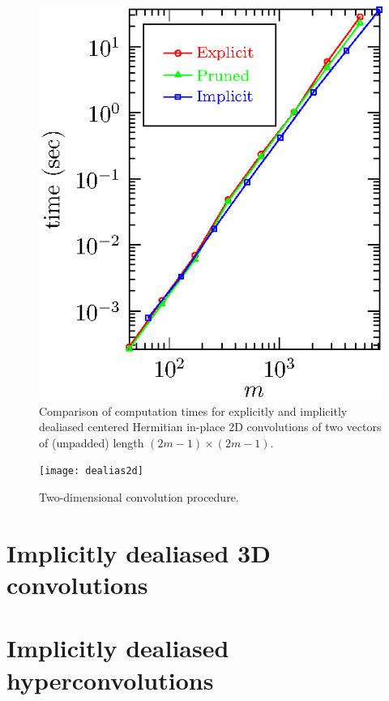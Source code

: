 \documentclass[final]{siamltex}
\begin{document}
\begin{figure}[htbp]
\begin{center}
\begin{minipage}{0.49\linewidth}
\begin{center}
\includegraphics{timing2r}
\caption{Comparison of computation times for explicitly and implicitly
dealiased centered Hermitian in-place 2D convolutions of two vectors of
(unpadded) length $(2m-1)\times (2m-1)$.}
\label{timing2r}
\end{center}
\end{minipage}
\end{center}
\end{figure}

\begin{figure}[htbp]
  \begin{center}
    \texttt{[image: dealias2d]}
    \caption{Two-dimensional convolution procedure.}
    \label{dealias2d}
  \end{center}
\end{figure}

\section{Implicitly dealiased 3D convolutions}\label{3d}

\section{Implicitly dealiased hyperconvolutions}\label{hyper}
\end{document}
